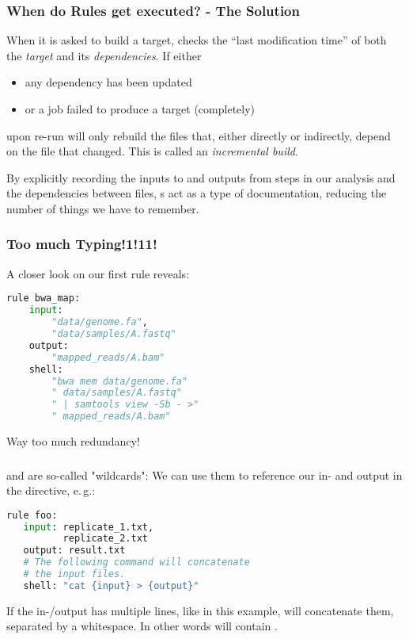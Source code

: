 \begin{frame}
  \frametitle{When do Rules get executed? - The Solution}
  When it is asked to build a target, \Snakemake{} checks the “last modification time” of both the \emph{target} and its \emph{dependencies}.
  If either
  \begin{itemize}
   \item any dependency has been updated
   \item or a job failed to produce a target (completely)
  \end{itemize}
  upon re-run \Snakemake{} will only rebuild the files that, either directly or indirectly, depend on the file that changed. This is called an \emph{incremental build}.
  \pause
  \begin{docs}
  	By explicitly recording the inputs to and outputs from steps in our analysis and the dependencies between files, s act as a type of documentation, reducing the number of things we have to remember.
  \end{docs}
\end{frame}

\begin{frame}[fragile]
  \frametitle{Too much Typing!1!11!}
  A closer look on our first rule reveals:
  \begin{lstlisting}[language=Python,style=Python]
rule bwa_map:
    input:
        "data/genome.fa",
        "data/samples/A.fastq"
    output:
        "mapped_reads/A.bam"
    shell:
        "bwa mem data/genome.fa"
        " data/samples/A.fastq"
        " | samtools view -Sb - >"
        " mapped_reads/A.bam"
    \end{lstlisting}
    \bcattention Way too much redundancy!
\end{frame}

\begin{frame}[fragile]
	\frametitle{}
	 and  are so-called "wildcards": We can use them 
	to reference our in- and output in the  directive, e.\,g.:
	\begin{lstlisting}[language=Python,style=Python]
rule foo:
   input: replicate_1.txt,
          replicate_2.txt
   output: result.txt
   # The following command will concatenate
   # the input files.
   shell: "cat {input} > {output}"
    \end{lstlisting}
    \begin{docs}
      If the in-/output has multiple lines, like in this example, \Snakemake{} will concatenate them, separated by a whitespace. In other words  will contain .
    \end{docs}
\end{frame}

